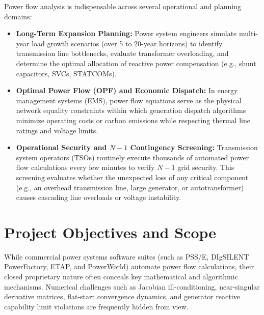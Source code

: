 \documentclass[12pt,a4paper,oneside]{report}
\begin{document}
Power flow analysis is indispensable across several operational and planning domains:
\begin{itemize}
    \item \textbf{Long-Term Expansion Planning:} Power system engineers simulate multi-year load growth scenarios (over 5 to 20-year horizons) to identify transmission line bottlenecks, evaluate transformer overloading, and determine the optimal allocation of reactive power compensation (e.g., shunt capacitors, SVCs, STATCOMs).
    \item \textbf{Optimal Power Flow (OPF) and Economic Dispatch:} In energy management systems (EMS), power flow equations serve as the physical network equality constraints within which generation dispatch algorithms minimize operating costs or carbon emissions while respecting thermal line ratings and voltage limits.
    \item \textbf{Operational Security and $N-1$ Contingency Screening:} Transmission system operators (TSOs) routinely execute thousands of automated power flow calculations every few minutes to verify $N-1$ grid security. This screening evaluates whether the unexpected loss of any critical component (e.g., an overhead transmission line, large generator, or autotransformer) causes cascading line overloads or voltage instability.
\end{itemize}

\section{Project Objectives and Scope}
While commercial power systems software suites (such as PSS/E, DIgSILENT PowerFactory, ETAP, and PowerWorld) automate power flow calculations, their closed proprietary nature often conceals key mathematical and algorithmic mechanisms. Numerical challenges such as Jacobian ill-conditioning, near-singular derivative matrices, flat-start convergence dynamics, and generator reactive capability limit violations are frequently hidden from view.
\end{document}
